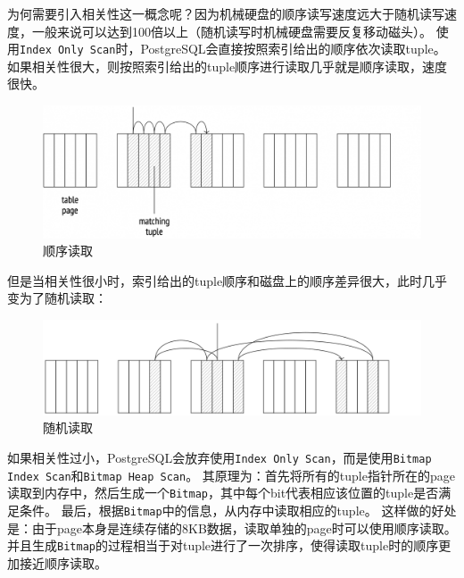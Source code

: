 \documentclass[a4paper,10pt]{ctexart}
\begin{document}
为何需要引入相关性这一概念呢？因为机械硬盘的顺序读写速度远大于随机读写速度，一般来说可以达到100倍以上（随机读写时机械硬盘需要反复移动磁头）。
使用\texttt{Index Only Scan}时，PostgreSQL会直接按照索引给出的顺序依次读取tuple。
如果相关性很大，则按照索引给出的tuple顺序进行读取几乎就是顺序读取，速度很快。
\begin{figure}[H]
    \centering
    \includegraphics[width=0.8\linewidth]{sequential read.png}
    \caption{顺序读取\protect\footnotemark} 
\end{figure}


但是当相关性很小时，索引给出的tuple顺序和磁盘上的顺序差异很大，此时几乎变为了随机读取：
\begin{figure}[H]
    \centering
    \includegraphics[width=0.8\linewidth]{random read.png}
    \caption{随机读取}
\end{figure}

如果相关性过小，PostgreSQL会放弃使用\texttt{Index Only Scan}，而是使用\texttt{Bitmap Index Scan}和\texttt{Bitmap Heap Scan}。
其原理为：首先将所有的tuple指针所在的page读取到内存中，然后生成一个\texttt{Bitmap}，其中每个bit代表相应该位置的tuple是否满足条件。
最后，根据\texttt{Bitmap}中的信息，从内存中读取相应的tuple。
这样做的好处是：由于page本身是连续存储的8KB数据，读取单独的page时可以使用顺序读取。
并且生成\texttt{Bitmap}的过程相当于对tuple进行了一次排序，使得读取tuple时的顺序更加接近顺序读取。
\end{document}
